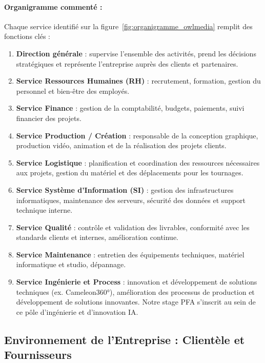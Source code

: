 \paragraph{Organigramme commenté :}
Chaque service identifié sur la figure~\ref{fig:organigramme_owlmedia} remplit des fonctions clés :
\begin{enumerate}
    \item \textbf{Direction générale} : supervise l'ensemble des activités, prend les décisions stratégiques et représente l'entreprise auprès des clients et partenaires.
    \item \textbf{Service Ressources Humaines (RH)} : recrutement, formation, gestion du personnel et bien-être des employés.
    \item \textbf{Service Finance} : gestion de la comptabilité, budgets, paiements, suivi financier des projets.
    \item \textbf{Service Production / Création} : responsable de la conception graphique, production vidéo, animation et de la réalisation des projets clients.
    \item \textbf{Service Logistique} : planification et coordination des ressources nécessaires aux projets, gestion du matériel et des déplacements pour les tournages.
    \item \textbf{Service Système d'Information (SI)} : gestion des infrastructures informatiques, maintenance des serveurs, sécurité des données et support technique interne.
    \item \textbf{Service Qualité} : contrôle et validation des livrables, conformité avec les standards clients et internes, amélioration continue.
    \item \textbf{Service Maintenance} : entretien des équipements techniques, matériel informatique et studio, dépannage.
    \item \textbf{Service Ingénierie et Process} : innovation et développement de solutions techniques (ex. Cameleon360°), amélioration des processus de production et développement de solutions innovantes. Notre stage PFA s'inscrit au sein de ce pôle d'ingénierie et d'innovation IA.
\end{enumerate}

\subsection{Environnement de l'Entreprise : Clientèle et Fournisseurs}

